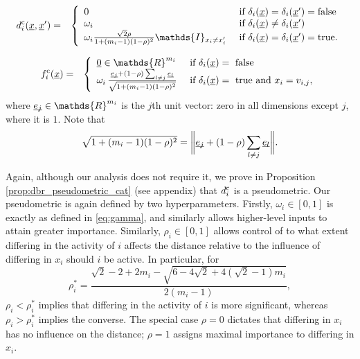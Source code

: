 \documentclass{article}
\newcommand{\vect}[1]{\underline{\smash{#1}}}
\renewcommand{\v}[1]{\vect{#1}}
\newcommand{\reals}{\mathds{R}}
\newcommand{\cat}{^{\text{\textnormal{c}}}}
\newcommand{\indicator}{\ensuremath\mathds{I}}
\begin{document}
\begin{eqnarray}
\nonumber{}d\cat_i(\v{x}, \v{x}') & = & \left\{
\begin{array}{ll}
\nonumber{} 0 & \textrm{ if } \delta_i(\v{x}) = \delta_i(\v{x}') = \textrm{false}\\
\nonumber{} \omega_i & \textrm{ if } \delta_i(\v{x}) \neq \delta_i(\v{x}')\\
\nonumber{} \omega_i \frac{\sqrt{2} \rho}
{1+(m_i-1)(1-\rho)^2}
 \indicator_{x_i \neq x_i'} 
& \textrm{ if } \delta_i(\v{x}) = \delta_i(\v{x}') = \textrm{true}.
\end{array}
\right.
\end{eqnarray}

\begin{eqnarray}
\nonumber{}f\cat_i(\v{x}) & = & \left\{\begin{array}{ll}
\v{0} \in \reals^{m_i} & \textrm{ if } \delta_i(\v{x}) = \textrm{ false }\\
\nonumber{} \omega_i\,\frac{\v{e_j}+(1-\rho)\sum_{l\neq j} \v{e_l}}
{\sqrt{1+(m_i-1)(1-\rho)^2}}
 & \textrm{ if } \delta_i(\v{x}) = \textrm{ true and } x_i = v_{i,j},
\end{array}\right.
\end{eqnarray}
\noindent{}where $\v{e_j} \in \reals^{m_i}$ is the $j$th unit vector: zero in all dimensions except $j$, where it is $1$. Note that
\begin{equation}
 \sqrt{1+(m_i-1)(1-\rho)^2} = \biggl\|\v{e_j}+(1-\rho)\sum_{l\neq j} \v{e_l}\biggr\|.
\end{equation}

\noindent{}Again, although our analysis does not require it, we prove in Proposition \ref{prop:dbr_pseudometric_cat} (see appendix) that $d\cat_i$ is a pseudometric. Our pseudometric is again defined by two hyperparameters. Firstly, $\omega_i\in[0,1]$ is exactly as defined in \eqref{eq:gamma}, and similarly allows higher-level inputs to attain greater importance. Similarly, $\rho_i\in[0,1]$ allows control of to what extent differing in the activity of $i$ affects the distance relative to the influence of differing in $x_i$ should $i$ be active. In particular, for
\begin{equation}
 \rho_i^\ast = 
\frac{\sqrt{2}-2+2m_i-\sqrt{6-4\sqrt{2}+4(\sqrt{2}-1)m_i}}
{2(m_i-1)},
\end{equation}
$\rho_i<\rho_i^\ast$ implies that differing in the activity of $i$ is more significant, whereas $\rho_i>\rho_i^\ast$ implies the converse. The special case $\rho = 0$ dictates that differing in $x_i$ has no influence on the distance; $\rho=1$ assigns maximal importance to differing in $x_i$. 
\end{document}

